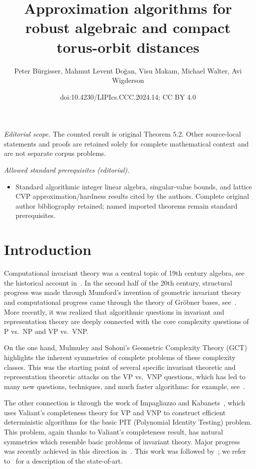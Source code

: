 \documentclass[10pt,a4paper]{article}
\title{Approximation algorithms for robust algebraic and compact torus-orbit distances}
\author{Peter Bürgisser, Mahmut Levent Doğan, Visu Makam, Michael Walter, Avi Wigderson}
\date{doi:10.4230/LIPIcs.CCC.2024.14; CC BY 4.0}
\theoremstyle{definition}
\numberwithin{equation}{section}
\begin{document}
\maketitle
\noindent\textit{Editorial scope.} The counted result is original Theorem 5.2. Other source-local statements and proofs are retained solely for complete mathematical context and are not separate corpus problems.\par\medskip
\noindent\textit{Allowed standard prerequisites (editorial).}\begin{itemize}
\item Standard algorithmic integer linear algebra, singular-value bounds, and lattice CVP approximation/hardness results cited by the authors. Complete original author bibliography retained; named imported theorems remain standard prerequisites.
\end{itemize}\medskip
\section{Introduction}
\label{sec:intro}

Computational invariant theory was a central topic of 19th century algebra,
see the historical account in~\cite{kung-rota:84}.
In the second half of the 20th century, structural progress was made through Mumford's invention
of geometric invariant theory ~\cite{MFK:94} and computational progress came through the theory of Gr\"{o}bner bases, see~\cite{Sturmfels}.
More recently, it was realized that algorithmic questions in invariant and representation theory
are deeply connected with the core complexity questions of P vs.~NP  and VP vs.~VNP.

On the one hand,
Mulmuley and Sohoni's Geometric Complexity Theory (GCT)~\cite{mulmuley2001geometric}
highlights the inherent symmetries of complete problems of these complexity classes.
This was the starting point of several specific invariant theoretic and
representation theoretic attacks on the VP vs.~VNP questions, which has led
to many new questions, techniques, and much faster algorithms:
for example, see~\cite{GCTV,FS,BCMW:17,MW19}.

The other connection is through
the work of Impagliazzo and Kabanets~\cite{KI04},
which uses Valiant's completeness theory for VP and VNP
to construct efficient deterministic algorithms
for the basic PIT (Polynomial Identity Testing) problem.
This problem, again thanks to Valiant's completeness result, has natural symmetries
which resemble basic problems of invariant theory.
Major progress was recently achieved in this direction in~\cite{Gur04,GGOW16,IQS,IQS2,DM-poly}.
This work was followed by~\cite{DM-oc, hamada-hirai, ivanyos-qiao,GGOW:20,BGOWW,BFGOWW,BLNW:20,BFGOWW2};
we refer to~\cite{BFGOWW2} for a description of the state-of-art.
\end{document}
